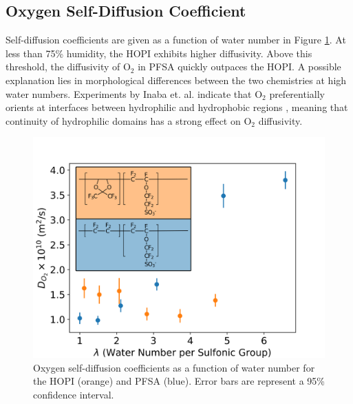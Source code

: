 \documentclass[journal=jacsat,manuscript=article]{achemso}
\begin{document}
\subsection{Oxygen Self-Diffusion Coefficient}
Self-diffusion coefficients are given as a function of water number in Figure \ref{fig:diffusivity}. At less than 75\% humidity, the HOPI exhibits higher diffusivity. Above this threshold, the diffusivity of O$_2$ in PFSA quickly outpaces the HOPI. A possible explanation lies in morphological differences between the two chemistries at high water numbers. Experiments by Inaba et. al. indicate that O$_2$ preferentially orients at interfaces between hydrophilic and hydrophobic regions \cite{inaba_oxygen_1993}, meaning that continuity of hydrophilic domains has a strong effect on O$_2$ diffusivity. 
\begin{figure}[h!]
  \includegraphics[width=0.9\linewidth]{diffusivity.png}
  \centering
  \caption{Oxygen self-diffusion coefficients as a function of water number for the HOPI (orange) and PFSA (blue). Error bars are represent a 95\% confidence interval.}
\label{fig:diffusivity}
\end{figure}
\end{document}
